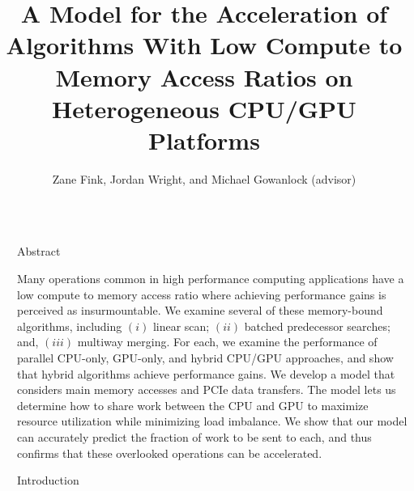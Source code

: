 \documentclass[final]{beamer}
\title{A Model for the Acceleration of Algorithms With Low Compute to Memory Access Ratios on Heterogeneous CPU/GPU Platforms}
\author{Zane Fink\inst{1}, Jordan Wright\inst{1}, and Michael Gowanlock (advisor)\inst{1}}
\institute[shortinst]{\inst{1} School of Informatics, Computing, and Cyber Systems at Northern Arizona University}
\newlength{\sepwidth}
\newlength{\colwidth}
\newcommand{\separatorcolumn}{\begin{column}{\sepwidth}\end{column}}
\begin{document}
\begin{frame}[t]
\begin{columns}[t]
\separatorcolumn

\begin{column}{\colwidth}

  \begin{block}{Abstract}


   Many operations common in high performance computing applications have a low compute to memory access ratio where achieving performance gains is perceived as insurmountable.
   We examine several of these memory-bound algorithms, 
   including $(i)$ linear scan; $(ii)$ batched predecessor searches; and, $(iii)$ multiway merging. 
   For each, we examine the performance of parallel CPU-only, GPU-only, and hybrid CPU/GPU approaches, and show 
   that hybrid algorithms achieve performance gains. We develop a model that considers 
   main memory accesses and PCIe data transfers. The model lets us determine how to share work between the CPU and GPU to maximize resource 
   utilization while minimizing load imbalance. We show that our model can accurately predict the fraction of work 
   to be sent to each, and thus confirms that these overlooked operations can be 
   accelerated. 
  \end{block}

  \begin{block}{Introduction}
    
\begin{description}[font=$\bullet$~\normalfont\scshape\color{red!50!black}]


\end{description}
\end{block}
\end{column}
\end{columns}
\end{frame}
\end{document}
